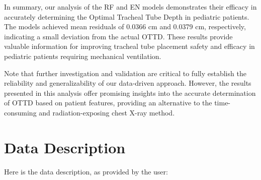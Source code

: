 \documentclass[11pt]{article}
\begin{document}
In summary, our analysis of the RF and EN models demonstrates their efficacy in accurately determining the Optimal Tracheal Tube Depth in pediatric patients. The models achieved mean residuals of 0.0366 cm and 0.0379 cm, respectively, indicating a small deviation from the actual OTTD. These results provide valuable information for improving tracheal tube placement safety and efficacy in pediatric patients requiring mechanical ventilation.

Note that further investigation and validation are critical to fully establish the reliability and generalizability of our data-driven approach. However, the results presented in this analysis offer promising insights into the accurate determination of OTTD based on patient features, providing an alternative to the time-consuming and radiation-exposing chest X-ray method.


\clearpage
\appendix

\section{Data Description} \label{sec:data_description} Here is the data description, as provided by the user:
\end{document}
